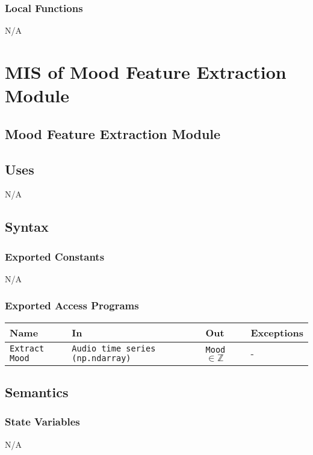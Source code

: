 \documentclass[12pt, titlepage]{article}
\begin{document}
\subsubsection{Local Functions}
N/A

\section{MIS of Mood Feature Extraction Module} 

\subsection{Mood Feature Extraction Module}

\subsection{Uses}
N/A

\subsection{Syntax}

\subsubsection{Exported Constants}
N/A

\subsubsection{Exported Access Programs}

\begin{center}
\begin{tabular}{p{2cm} p{4cm} p{4cm} p{2cm}}
\hline
\textbf{Name} & \textbf{In} & \textbf{Out} & \textbf{Exceptions}\\
\hline%
\texttt{Extract Mood} &\texttt{Audio time series (np.ndarray)} &\texttt{Mood} $\in{\mathbb{Z}}$ &-\\
\hline
\end{tabular}
\end{center}

\subsection{Semantics}

\subsubsection{State Variables}
N/A
\end{document}
